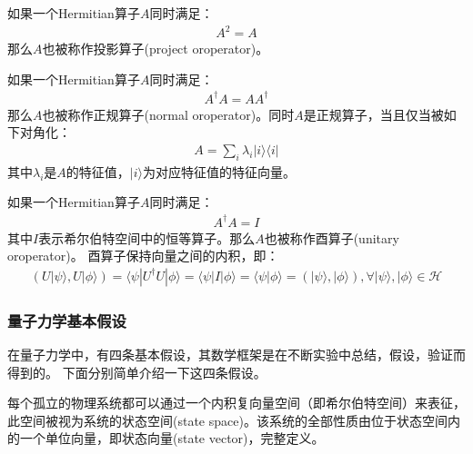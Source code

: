 如果一个Hermitian算子\(A\)同时满足：
\begin{align}
    A^2 = A
\end{align}
那么\(A\)也被称作投影算子(project oroperator)。

如果一个Hermitian算子\(A\)同时满足：
\begin{align}
    A^\dagger A = A A^\dagger
\end{align}
那么\(A\)也被称作正规算子(normal oroperator)。同时\(A\)是正规算子，当且仅当被如下对角化：
\begin{align}
    A = \sum_{i}\lambda_i |i\rangle\langle i|
\end{align}
其中$\lambda_i$是$A$的特征值，$|i\rangle$为对应特征值的特征向量。

如果一个Hermitian算子\(A\)同时满足：
\begin{align}
    A^\dagger A = I
\end{align}
其中$I$表示希尔伯特空间中的恒等算子。那么\(A\)也被称作酉算子(unitary oroperator)。
酉算子保持向量之间的内积，即：
\begin{align}
    (U|\psi\rangle, U|\phi\rangle) = \langle \psi|U^\dagger U|\phi\rangle = \langle \psi|I|\phi\rangle = \langle \psi|\phi\rangle = (|\psi\rangle, |\phi\rangle), \forall |\psi \rangle, |\phi \rangle\in \mathcal{H}
\end{align}
\subsubsection*{量子力学基本假设}
在量子力学中，有四条基本假设，其数学框架是在不断实验中总结，假设，验证而得到的。
下面分别简单介绍一下这四条假设。
\begin{theorem}
    每个孤立的物理系统都可以通过一个内积复向量空间（即希尔伯特空间）来表征，此空间被视为系统的状态空间(state space)。该系统的全部性质由位于状态空间内的一个单位向量，即状态向量(state vector)，完整定义。
\end{theorem}

